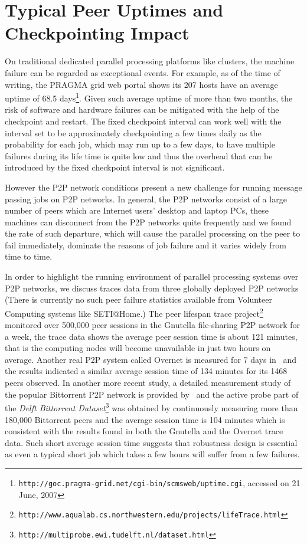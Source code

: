 \documentclass[times, 12pt, onecolumn]{article}
\begin{document}
\section{Typical Peer Uptimes and Checkpointing Impact}
\label{limitations}
On traditional dedicated parallel processing platforms like clusters, the machine failure can be 
regarded as exceptional events. For example, as of the time of writing, the PRAGMA grid web portal 
shows its 207 hosts have an average uptime of 68.5 days\footnote{{\tt http://goc.pragma-grid.net/cgi-bin/scmsweb/uptime.cgi}, 
accessed on 21 June, 2007}. Given such average uptime of more than two months, the risk of software and hardware 
failures can be mitigated with the help of the checkpoint and restart. The fixed checkpoint 
interval can work well with the interval set to be approximately checkpointing a few times daily as the 
probability for each job, which may run up to a few days, to have multiple failures during its life time 
is quite low and thus the overhead that can be introduced by the fixed checkpoint interval is not significant. 

However the P2P network conditions present a new challenge for running message passing jobs on P2P networks. 
In general, the P2P networks consist of a large number of peers which are Internet users' desktop and laptop 
PCs, these machines can disconnect from the P2P networks quite frequently and we found the rate of such 
departure, which will cause the parallel processing on the peer to fail immediately, dominate the reasons 
of job failure and it varies widely from time to time. 

In order to highlight the running environment of parallel processing systems over P2P networks, we discuss
traces data from three globally deployed P2P networks (There is currently no such peer failure statistics 
available from Volunteer Computing systems like SETI@Home.) 
The peer lifespan trace project\footnote{{\tt http://www.aqualab.cs.northwestern.edu/projects/lifeTrace.html}} 
monitored over 500,000 peer sessions in the Gnutella file-sharing P2P network for a week, the trace 
data shows the average peer session time is about 121 minutes, that is the computing nodes will become 
unavailable in just two hours on average. Another real P2P system called Overnet is measured for 7 days 
in~\cite{BhagwanSV03} and the results indicated a similar average session time of 134 minutes for its 
1468 peers observed. In another more recent study, a detailed measurement study of the popular Bittorrent 
P2P network is provided by~\cite{Powlese05BitTorrent} and the active probe part of the 
\emph{Delft Bittorrent Dataset}\footnote{\tt {http://multiprobe.ewi.tudelft.nl/dataset.html}} was obtained by 
continuously measuring more than 180,000 Bittorrent peers and the average session time is 104 minutes which 
is consistent with the results found in both the Gnutella and the Overnet trace data. Such short average
session time suggests that robustness design is essential as even a typical short job which takes a few 
hours will suffer from a few failures. 
\end{document}
